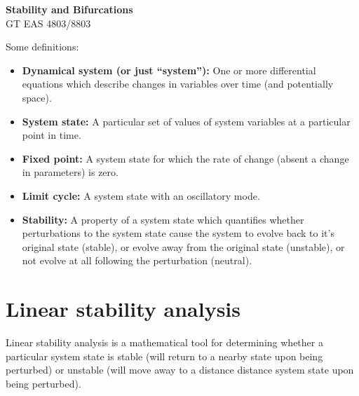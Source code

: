 \documentclass[12pt]{article}
\theoremstyle{definition}
\begin{document}
\thispagestyle{empty}

\begin{center}
{\LARGE \bf Stability and Bifurcations}\\
{\large GT EAS 4803/8803}\\
\end{center}

\begin{center}
\end{center}

Some definitions: \\
\begin{itemize}
\item \textbf{Dynamical system (or just ``system''):} One or more differential equations which describe changes in variables over time (and potentially space).
\item \textbf{System state:} A particular set of values of system variables at a particular point in time.
\item \textbf{Fixed point:} A system state for which the rate of change (absent a change in parameters) is zero.
\item \textbf{Limit cycle:} A system state with an oscillatory mode.
\item \textbf{Stability:} A property of a system state which quantifies whether perturbations to the system state cause the system to evolve back to it's original state (stable), or evolve away from the original state (unstable), or not evolve at all following the perturbation (neutral).
\end{itemize}

\section{Linear stability analysis}
Linear stability analysis is a mathematical tool for determining whether a particular system state is stable (will return to a nearby state upon being perturbed) or unstable (will move away to a distance distance system state upon being perturbed).
\end{document}
